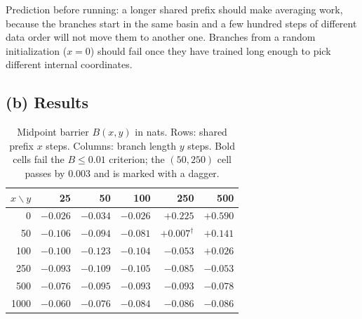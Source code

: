\documentclass[10pt,letterpaper]{article}
\begin{document}
Prediction before running: a longer shared prefix should make averaging work, because the branches start in the same basin and a few hundred steps of different data order will not move them to another one. Branches from a random initialization ($x=0$) should fail once they have trained long enough to pick different internal coordinates.

\subsection*{(b) Results}

\begin{table}[H]\centering\small
\caption{Midpoint barrier $B(x,y)$ in nats. Rows: shared prefix $x$ steps. Columns: branch length $y$ steps. Bold cells fail the $B\le0.01$ criterion; the $(50,250)$ cell passes by 0.003 and is marked with a dagger.}
\begin{tabular}{r|rrrrr}\toprule
$x\backslash y$ & 25 & 50 & 100 & 250 & 500\\\midrule
0 & $-0.026$ & $-0.034$ & $-0.026$ & $\mathbf{+0.225}$ & $\mathbf{+0.590}$\\
50 & $-0.106$ & $-0.094$ & $-0.081$ & $+0.007^\dagger$ & $\mathbf{+0.141}$\\
100 & $-0.100$ & $-0.123$ & $-0.104$ & $-0.053$ & $\mathbf{+0.026}$\\
250 & $-0.093$ & $-0.109$ & $-0.105$ & $-0.085$ & $-0.053$\\
500 & $-0.076$ & $-0.095$ & $-0.093$ & $-0.093$ & $-0.078$\\
1000 & $-0.060$ & $-0.076$ & $-0.084$ & $-0.086$ & $-0.086$\\\bottomrule
\end{tabular}
\end{table}
\end{document}
